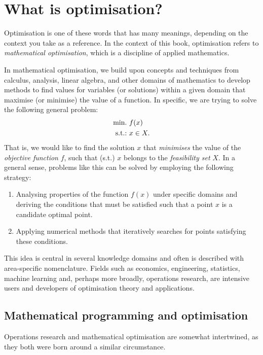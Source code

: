 \section{What is optimisation?}

Optimisation is one of these words that has many meanings, depending on the context you take as a reference. In the context of this book, optimisation refers to \emph{mathematical optimisation}, which is a discipline of applied mathematics.

In mathematical optimisation, we build upon concepts and techniques from calculus, analysis, linear algebra, and other domains of mathematics to develop methods to find values for variables (or solutions) within a given domain that maximise (or minimise) the value of a function. In specific, we are trying to solve the following general problem:
%
\begin{align}
    \mathop{\text{min.~}} & f(x) \label{p1c1:eq:opt_prob} \\
    \mathop{\text{s.t.:~}}   & x \in X. \nonumber
\end{align}
%
That is, we would like to find the solution $x$ that \emph{minimises} the value of the \emph{objective function} $f$, such that (s.t.) $x$ belongs to the \emph{feasibility set} $X$. In a general sense, problems like this can be solved by employing the following strategy:
%
\begin{enumerate}
    \item Analysing properties of the function $f(x)$ under specific domains and deriving the conditions that must be satisfied such that a point $x$ is a candidate optimal point.
    \item Applying numerical methods that iteratively searches for points satisfying these conditions. 
\end{enumerate}
%
This idea is central in several knowledge domains and often is described with area-specific nomenclature. Fields such as economics, engineering, statistics, machine learning and, perhaps more broadly, operations research, are intensive users and developers of optimisation theory and applications. 

\subsection{Mathematical programming and optimisation}

Operations research and mathematical optimisation are somewhat intertwined, as they both were born around a similar circumstance. %

